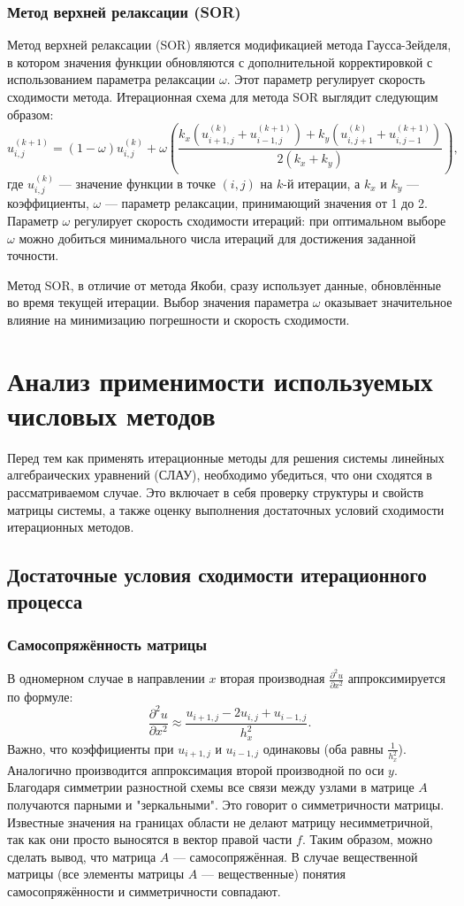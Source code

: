 \documentclass[a4paper, fleqn]{report}
\begin{document}
\subsection*{Метод верхней релаксации (SOR)}
Метод верхней релаксации (SOR) является модификацией метода Гаусса-Зейделя, в котором значения функции обновляются с дополнительной корректировкой с использованием параметра релаксации \( \omega \). Этот параметр регулирует скорость сходимости метода. Итерационная схема для метода SOR выглядит следующим образом:
\[
u_{i,j}^{(k+1)} = (1 - \omega) u_{i,j}^{(k)} + \omega \left( \frac{k_x (u_{i+1,j}^{(k)} + u_{i-1,j}^{(k+1)}) + k_y (u_{i,j+1}^{(k)} + u_{i,j-1}^{(k+1)})}{2(k_x + k_y)} \right),
\]
где \( u_{i,j}^{(k)} \) — значение функции в точке \((i, j)\) на \( k \)-й итерации, а \( k_x \) и \( k_y \) — коэффициенты, \( \omega \) — параметр релаксации, принимающий значения от 1 до 2. Параметр \( \omega \) регулирует скорость сходимости итераций: при оптимальном выборе \( \omega \) можно добиться минимального числа итераций для достижения заданной точности.

Метод SOR, в отличие от метода Якоби, сразу использует данные, обновлённые во время текущей итерации. Выбор значения параметра \( \omega \) оказывает значительное влияние на минимизацию погрешности и скорость сходимости.


\chapter{Анализ применимости используемых числовых методов}

Перед тем как применять итерационные методы для решения системы линейных алгебраических уравнений (СЛАУ), необходимо убедиться, что они сходятся в рассматриваемом случае. Это включает в себя проверку структуры и свойств матрицы системы, а также оценку выполнения достаточных условий сходимости итерационных методов.

\section*{Достаточные условия сходимости итерационного процесса}

\subsection*{Самосопряжённость матрицы}
В одномерном случае в направлении $x$ вторая производная $\frac{\partial^2 u}{\partial x^2}$ аппроксимируется по формуле:
\[
\frac{\partial^2 u}{\partial x^2} \approx \frac{u_{i+1,j} - 2u_{i,j} + u_{i-1,j}}{h_x^2}.
\]
Важно, что коэффициенты при $u_{i+1,j}$ и $u_{i-1,j}$ одинаковы (оба равны $\frac{1}{h_x^2}$).  
Аналогично производится аппроксимация второй производной по оси $y$.
Благодаря симметрии разностной схемы все связи между узлами в матрице $A$ получаются парными и "зеркальными". Это говорит о симметричности матрицы. Известные значения на границах области не делают матрицу несимметричной, так как они просто выносятся в вектор правой части $f$. Таким образом, можно сделать вывод, что матрица $A$ — самосопряжённая. В случае вещественной матрицы (все элементы матрицы $A$ — вещественные) понятия самосопряжённости и симметричности совпадают.
\end{document}
